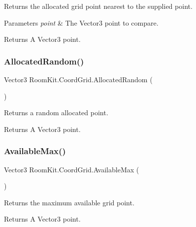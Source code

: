 Returns the allocated grid point nearest to the supplied point. 


\begin{DoxyParams}{Parameters}
{\em point} & The Vector3 point to compare.\\
\hline
\end{DoxyParams}
\begin{DoxyReturn}{Returns}
A Vector3 point. 
\end{DoxyReturn}
\mbox{\label{class_room_kit_1_1_coord_grid_a5b5e606530fdff2cea08391a1bf59f6e}} 
\subsubsection{\texorpdfstring{Allocated\+Random()}{AllocatedRandom()}}
{\footnotesize\ttfamily Vector3 Room\+Kit.\+Coord\+Grid.\+Allocated\+Random (\begin{DoxyParamCaption}{ }\end{DoxyParamCaption})}



Returns a random allocated point. 

\begin{DoxyReturn}{Returns}
A Vector3 point. 
\end{DoxyReturn}
\mbox{\label{class_room_kit_1_1_coord_grid_a408f51d641e9bb3ec4e59fe8b62a0163}} 
\subsubsection{\texorpdfstring{Available\+Max()}{AvailableMax()}}
{\footnotesize\ttfamily Vector3 Room\+Kit.\+Coord\+Grid.\+Available\+Max (\begin{DoxyParamCaption}{ }\end{DoxyParamCaption})}



Returns the maximum available grid point. 

\begin{DoxyReturn}{Returns}
A Vector3 point. 
\end{DoxyReturn}
\mbox{\label{class_room_kit_1_1_coord_grid_a1b5d8ba25a0e67b9f9b7c6123ae387c5}} 
